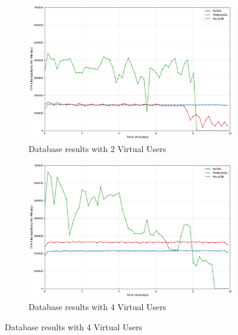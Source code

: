 \begin{figure}[H]
    \centering
    \hspace*{-1.7cm}
    \begin{subfigure}[b]{0.6\textwidth}
        \centering
        \includegraphics[width=\linewidth]{Images/db_comparison_2_users.png}
        \caption{Database results with 2 Virtual Users}
        \label{fig:db-2vu}
    \end{subfigure}%
    \begin{subfigure}[b]{0.6\textwidth}
        \centering
        \includegraphics[width=\linewidth]{Images/db_comparison_4_users.png}
        \caption{Database results with 4 Virtual Users}
        \label{fig:db-4vu}
    \end{subfigure}

    \vspace{0.5cm}


\end{figure}
